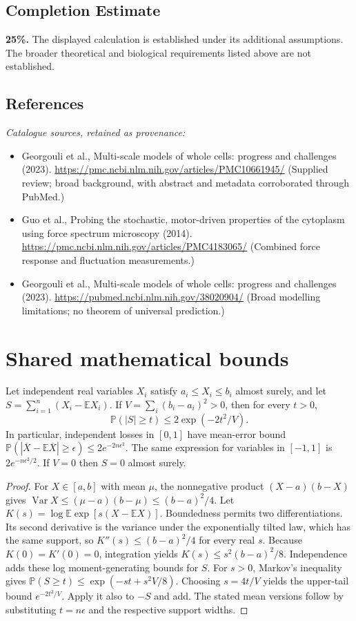 \documentclass[11pt]{article}
\begin{document}
\subsection{Completion Estimate}
\textbf{25\%.} The displayed calculation is established under its additional assumptions. The broader theoretical and biological requirements listed above are not established.
\subsection{References}
\noindent\emph{Catalogue sources, retained as provenance:}
\begin{itemize}
\item Georgouli et al., Multi-scale models of whole cells: progress and challenges (2023). \url{https://pmc.ncbi.nlm.nih.gov/articles/PMC10661945/} (Supplied review; broad background, with abstract and metadata corroborated through PubMed.)
\item Guo et al., Probing the stochastic, motor-driven properties of the cytoplasm using force spectrum microscopy (2014). \url{https://pmc.ncbi.nlm.nih.gov/articles/PMC4183065/} (Combined force response and fluctuation measurements.)
\item Georgouli et al., Multi-scale models of whole cells: progress and challenges (2023). \url{https://pubmed.ncbi.nlm.nih.gov/38020904/} (Broad modelling limitations; no theorem of universal prediction.)
\end{itemize}




\section{Shared mathematical bounds}\label{app:bounds}
\begin{lemma}\label{lem:bounded}
Let independent real variables $X_i$ satisfy $a_i\leq X_i\leq b_i$ almost surely,
and let $S=\sum_{i=1}^n(X_i-\mathbb{E} X_i)$. If
$V=\sum_i(b_i-a_i)^2>0$, then for every $t>0$,
\[
 \mathbb{P}(|S|\geq t)\leq 2\exp(-2t^2/V).
\]
In particular, independent losses in $[0,1]$ have mean-error bound
$\mathbb{P}(|\overline X-\mathbb{E}\overline X|\geq\epsilon)
\leq2e^{-2n\epsilon^2}$. The same expression for variables in $[-1,1]$
is $2e^{-n\epsilon^2/2}$. If $V=0$ then $S=0$ almost surely.
\end{lemma}
\begin{proof}
For $X\in[a,b]$ with mean $\mu$, the nonnegative product
$(X-a)(b-X)$ gives
$\operatorname{Var} X\leq(\mu-a)(b-\mu)\leq(b-a)^2/4$.
Let $K(s)=\log\mathbb{E}\exp[s(X-\mathbb{E} X)]$.
Boundedness permits two differentiations. Its second derivative is the variance
under the exponentially tilted law, which has the same support, so
$K''(s)\leq(b-a)^2/4$ for every real $s$.
Because $K(0)=K'(0)=0$, integration yields
$K(s)\leq s^2(b-a)^2/8$.
Independence adds these log moment-generating bounds for $S$.
For $s>0$, Markov's inequality gives
$\mathbb{P}(S\geq t)\leq\exp(-st+s^2V/8)$.
Choosing $s=4t/V$ yields the upper-tail bound $e^{-2t^2/V}$.
Apply it also to $-S$ and add. The stated mean versions follow by substituting
$t=n\epsilon$ and the respective support widths.
\end{proof}
\end{document}
